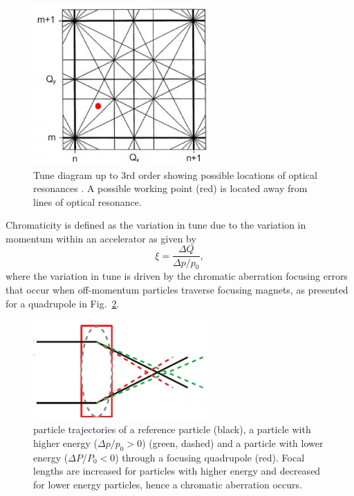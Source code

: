 \documentclass[../main.tex]{subfiles}
\begin{document}
\begin{figure}[!h]
\centering
\includegraphics[width=0.6\textwidth]{Figures/Energy_Recovery_Linac_Design/Tune_Diagram_fixed.pdf}
\caption{Tune diagram up to 3rd order showing possible locations of optical resonances \cite{wille2000physics}. A possible working point (red) is located away from lines of optical resonance.}
\label{fig:tune_diagram}
\end{figure}

Chromaticity is defined as the variation in tune due to the variation in momentum within an accelerator as given by
\begin{equation}
\xi = \frac{\Delta Q}{\Delta p/p_{0}},
\label{eq:accelerator_chromaticity}    
\end{equation}
where the variation in tune is driven by the chromatic aberration focusing errors that occur when off-momentum particles traverse focusing magnets, as presented for a quadrupole in Fig.~\ref{fig:chromatic_aberration}.

\begin{figure}[!h]
\centering
\includegraphics[width=0.6\textwidth]{Figures/Energy_Recovery_Linac_Design/Chromatic_Aberration_fixed.pdf}
\caption{particle trajectories of a reference particle (black), a particle with higher energy ($\Delta p/p_{0}>0$) (green, dashed) and a particle with lower energy ($\Delta P/P_{0}<0$) through a focusing quadrupole (red). Focal lengths are increased for particles with higher energy and decreased for lower energy particles, hence a chromatic aberration occurs. }
\label{fig:chromatic_aberration}
\end{figure}
\end{document}
